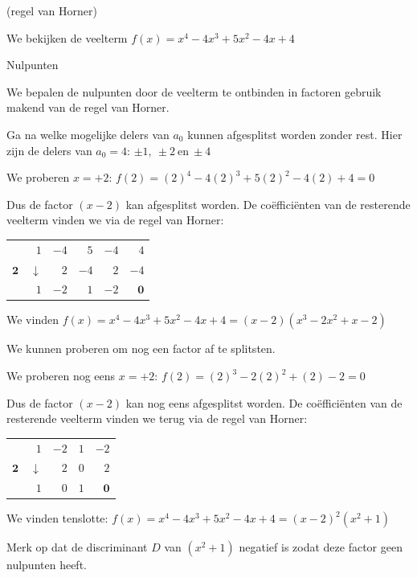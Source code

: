 \begin{voorbeeld}
	 (regel van Horner)

We bekijken de veelterm $f(x)=x^{4}-4x^{3}+5x^{2}-4x+4$

Nulpunten

We bepalen de nulpunten door de veelterm te ontbinden in
factoren gebruik makend van de regel van Horner.

Ga na welke mogelijke delers van $a_{0}$ kunnen afgesplitst
worden zonder rest. Hier zijn de delers van $a_{0}=4$: $\pm1,\:\pm2\:\textrm{en}\:\pm4$

We proberen $x=+2$: $f(2)=(2)^{4}-4(2)^{3}+5(2)^{2}-4(2)+4=0$

Dus de factor $(x-2)$ kan afgesplitst worden. De co\"effici\"enten
van de resterende veelterm vinden we via de regel van Horner:

\begin{center}
\begin{tabular}{r|rrrrr}
	& $1$ & $-4$ & $5$ & $-4$ & $4$\\
	$\mathbf{2}$ & $\downarrow$ & $2$ & $-4$ & $2$ & $-4$\\
	\hline  
	& $1$ & $-2$ & $1$ & \multicolumn{1}{r||}{$-2$} & $\mathbf{0}$\\
\end{tabular}	
\end{center}

We vinden $f(x)=x^{4}-4x^{3}+5x^{2}-4x+4=(x-2)(x^{3}-2x^{2}+x-2)$

We kunnen proberen om nog een factor af te splitsten.

We proberen nog eens $x=+2$: $f(2)=(2)^{3}-2(2)^{2}+(2)-2=0$

Dus de factor $(x-2)$ kan nog eens afgesplitst worden.
De co\"effici\"enten van de resterende veelterm vinden we terug via de
regel van Horner:

\begin{center}
\begin{tabular}{r|rrrr}
	& $1$ & $-2$ & $1$ & $-2$\\
	$\mathbf{2}$ & $\downarrow$ & $2$ & $0$ & $2$\\
	\hline 
	& $1$ & $0$ & \multicolumn{1}{r||}{$1$} & $\mathbf{0}$\\
\end{tabular}
\end{center}

We vinden tenslotte: $f(x)=x^{4}-4x^{3}+5x^{2}-4x+4=(x-2)^{2}(x^{2}+1)$

Merk op dat de discriminant $D$ van $(x^{2}+1)$ negatief
is zodat deze factor geen nulpunten heeft.


\end{voorbeeld}
